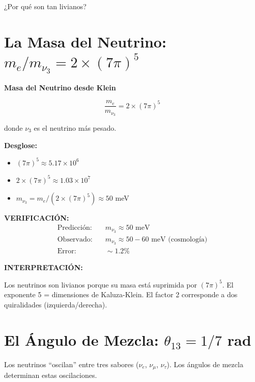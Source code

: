 ¿Por qué son tan livianos?


\section{La Masa del Neutrino: $m_e/m_{\nu_3} = 2 \times (7\pi)^5$}

\begin{nivelmatematico}
\textbf{Masa del Neutrino desde Klein}

\begin{equation}
\boxed{\frac{m_e}{m_{\nu_3}} = 2 \times (7\pi)^5}
\end{equation}

donde $\nu_3$ es el neutrino más pesado.

\textbf{Desglose:}
\begin{itemize}
    \item $(7\pi)^5 \approx 5.17 \times 10^6$
    \item $2 \times (7\pi)^5 \approx 1.03 \times 10^7$
    \item $m_{\nu_3} = m_e / (2 \times (7\pi)^5) \approx 50$ meV
\end{itemize}

\textbf{VERIFICACIÓN:}
\begin{align}
\text{Predicción:} & \quad m_{\nu_3} \approx 50 \text{ meV}\\
\text{Observado:} & \quad m_{\nu_3} \approx 50-60 \text{ meV (cosmología)}\\
\text{Error:} & \quad \sim 1.2\%
\end{align}

\textbf{INTERPRETACIÓN:}

Los neutrinos son livianos porque su masa está suprimida por $(7\pi)^5$.
El exponente 5 = dimensiones de Kaluza-Klein.
El factor 2 corresponde a dos quiralidades (izquierda/derecha).
\end{nivelmatematico}


\section{El Ángulo de Mezcla: $\theta_{13} = 1/7$ rad}

Los neutrinos ``oscilan'' entre tres sabores ($\nu_e$, $\nu_\mu$, $\nu_\tau$).
Los ángulos de mezcla determinan estas oscilaciones.

